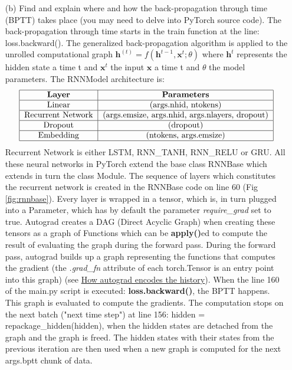 \documentclass[11pt]{article}
\newcommand{\0}{\mat{0}}
\newcommand{\vect}[1]{\bm{#1}}     %
\begin{document}
\begin{itemize}
           
   \item[(b)]
   Find and explain where and how the back-propagation through time (BPTT) takes place (you may need to delve into PyTorch source code). 
   The back-propagation through time starts in the train function at the line: loss.backward(). The generalized back-propagation algorithm is applied to the unrolled computational graph $\vect{h}^(t) = f(\vect{h}^{t-1}, \vect{x}^t; \theta)$ where $\vect{h}^t$ represents the hidden state a time t and $\vect{x}^t$ the input $\vect{x}$ a time t and $\theta$ the model parameters.
   The RNNModel architecture is:
   \[
  	 \begin{tabular}{| c | c | c |}
  	  \hline
	  \textbf{Layer} & \textbf{Parameters}  \\
	  \hline
	  \text{Linear} & \text{(args.nhid, ntokens)}  \\
	  \hline
	  \text{Recurrent Network} & \text{(args.emsize, args.nhid, args.nlayers, dropout)}  \\
	  \hline
	  \text{Dropout} & \text{(dropout)} \\
	  \hline
	  \text{Embedding} & \text{(ntokens, args.emsize)}  \\
	  \hline
	\end{tabular}
\] 
Recurrent Network is either LSTM, RNN\_TANH, RNN\_RELU or GRU. All these neural networks  in PyTorch extend the base class RNNBase which extends in turn the class Module. The sequence of layers which constitutes the recurrent network is created in the RNNBase code on line 60 (Fig \ref{fig:rnnbase}). Every layer is wrapped in a tensor, which is, in turn plugged into a Parameter, which has by default the parameter \textit{require\_grad} set to true. Autograd  creates a DAG (Direct Acyclic Graph) when creating these tensors as a graph of Functions which can be \textbf{apply()}ed to compute the result of evaluating the graph during the forward pass. During the forward pass,  autograd builds up a graph representing the functions that computes the gradient (the \textit{.grad\_fn} attribute of each torch.Tensor is an entry point into this graph) (see \href{https://pytorch.org/docs/stable/notes/autograd.html} {How autograd encodes the history}). When the line 160 of the main.py script is executed: \textbf{loss.backward()}, the BPTT happens. This graph is evaluated to compute the gradients. The computation stops on the next batch ("next time step") at line 156: hidden = repackage\_hidden(hidden), when the hidden states are detached from the graph and the graph is freed. The hidden states with their states from the previous iteration are then used when a new graph is computed for the next args.bptt chunk of data. 


\end{itemize}
\end{document}
